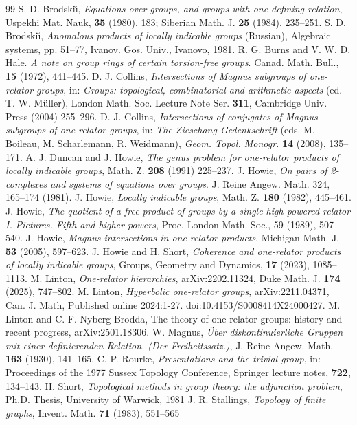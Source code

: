 \documentclass[12pt,a4paper]{amsart}
\begin{document}
\begin{thebibliography}{99}
 S. D. Brodski\u\i, 
{\em Equations over groups, and groups with one defining relation}, 
Uspekhi Mat. Nauk, {\bf 35} (1980), 183;	
Siberian Math. J.
{\bf 25}
(1984), 235--251.
 S. D. Brodski\u\i, {\em Anomalous products of locally indicable groups}
(Russian), Algebraic systems,
pp. 51--77, Ivanov. Gos. Univ., Ivanovo, 1981.
 R. G. Burns and V. W. D. Hale. {\em A note on group rings of certain torsion-free groups}.
Canad. Math. Bull., {\bf 15} (1972), 441--445.
 D. J. Collins, {\em Intersections of Magnus subgroups of one-relator
groups}, in: {\em Groups:
topological, combinatorial and arithmetic aspects} (ed. T. W. M\"uller), London Math. Soc. Lecture Note
Ser. {\bf 311}, Cambridge Univ. Press (2004) 255--296.
 D. J. Collins, {\em Intersections of conjugates of Magnus subgroups of one-relator groups}, in: {\em The Zieschang Gedenkschrift} (eds. M. Boileau, M. Scharlemann, R. Weidmann), {\em Geom. Topol. Monogr.} {\bf 14} (2008), 135--171.
 A. J. Duncan and J. Howie, {\em The genus problem for one-relator products of locally indicable groups}, Math. Z. {\bf 208} (1991) 225--237.
 J. Howie, {\em On pairs of 2-complexes and systems of equations over groups}. J. Reine Angew.
Math. 324, 165--174 (1981).
 J. Howie, {\em Locally indicable groups}, Math. Z. {\bf 180} (1982), 445--461. 
 J. Howie, {\em The quotient of a free product of groups by a single high-powered relator  I. Pictures.
	Fifth and higher powers}, Proc. London Math. Soc., 59 (1989), 507--540. 
 J. Howie, {\em Magnus intersections in one-relator products}, Michigan Math. J. {\bf 53} (2005), 597--623.
 J. Howie and H. Short, {\em Coherence  and one-relator products of locally indicable groups}, Groups, Geometry and Dynamics, {\bf 17} (2023), 1085--1113.
 M. Linton, {\em One-relator hierarchies}, 	arXiv:2202.11324,  Duke Math. J.   {\bf 174} (2025), 747--802.
 M. Linton, {\em Hyperbolic one-relator groups}, arXiv:2211.04371, Can. J. Math,  Published online 2024:1-27. doi:10.4153/S0008414X24000427.
 M. Linton and C.-F. Nyberg-Brodda, The theory of one-relator groups:
history and recent progress, arXiv:2501.18306.
 W. Magnus, {\em \"{U}ber diskontinuierliche Gruppen mit einer definierenden Relation. (Der Freiheitssatz.)}, 
J. Reine Angew. Math. {\bf 163} (1930), 141--165.
 C. P. Rourke, {\em Presentations and the trivial group}, in: Proceedings of the 1977 Sussex Topology Conference, Springer lecture notes, {\bf 722}, 134--143.
 H. Short, {\em Topological methods in group theory: the adjunction problem}, Ph.D. Thesis,
University of Warwick, 1981
 J. R. Stallings, {\em Topology of finite graphs},  Invent. Math. {\bf 71} (1983), 551--565
\end{thebibliography}
\end{document}
